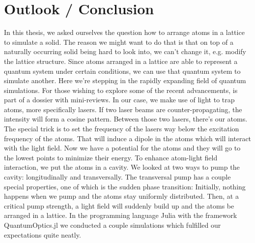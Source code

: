 \section{Outlook / Conclusion}

In this thesis, we asked ourselves the question how to arrange atoms in a lattice to simulate a solid. The reason we might want to do that is that on top of a naturally occurring solid being hard to look into, we can't change it, e.g. modify the lattice structure. Since atoms arranged in a lattice are able to represent a quantum system under certain conditions, we can use that quantum system to simulate another. Here we're stepping in the rapidly expanding field of quantum simulations. For those wishing to explore some of the recent advancements, \cite{quantum_sanchez} is part of a dossier with mini-reviews. In our case, we make use of light to trap atoms, more specifically lasers. If two laser beams are counter-propagating, the intensity will form a cosine pattern. Between those two lasers, there's our atoms. The special trick is to set the frequency of the lasers way below the excitation frequency of the atoms. That will induce a dipole in the atoms which will interact with the light field. Now we have a potential for the atoms and they will go to the lowest points to minimize their energy. To enhance atom-light field interaction, we put the atoms in a cavity. We looked at two ways to pump the cavity: longitudinally and transversally. The transversal pump has a couple special properties, one of which is the sudden phase transition: Initially, nothing happens when we pump and the atoms stay uniformly distributed. Then, at a critical pump strength, a light field will suddenly build up and the atoms be arranged in a lattice. In the programming language Julia with the framework QuantumOptics.jl we conducted a couple simulations which fulfilled our expectations quite neatly.